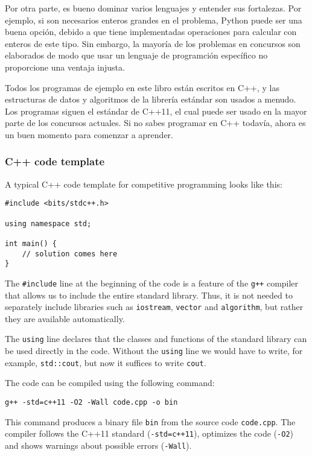 Por otra parte, es bueno dominar varios lenguajes
y entender sus fortalezas. Por ejemplo, si son
necesarios enteros grandes en el problema,
Python puede ser una buena opci\'on, debido
a que tiene implementadas operaciones para
calcular con enteros de este tipo.
Sin embargo, la mayor\'ia de los problemas
en concursos son elaborados de modo que usar
un lenguaje de programci\'on espec\'ifico
no proporcione una ventaja injusta.

Todos los programas de ejemplo en este libro est\'an
escritos en C++, y las estructuras de datos y
algoritmos de la librer\'ia est\'andar son usados
a menudo. Los programas siguen el est\'andar de C++11,
el cual puede ser usado en la mayor parte de los
concursos actuales. Si no sabes programar en
C++ todav\'ia, ahora es un buen momento
para comenzar a aprender.

\subsubsection{C++ code template}

A typical C++ code template for competitive programming
looks like this:

\begin{lstlisting}
#include <bits/stdc++.h>

using namespace std;

int main() {
    // solution comes here
}
\end{lstlisting}

The \texttt{\#include} line at the beginning
of the code is a feature of the \texttt{g++} compiler
that allows us to include the entire standard library.
Thus, it is not needed to separately include
libraries such as \texttt{iostream},
\texttt{vector} and \texttt{algorithm},
but rather they are available automatically.

The \texttt{using} line declares
that the classes and functions
of the standard library can be used directly
in the code.
Without the \texttt{using} line we would have
to write, for example, \texttt{std::cout},
but now it suffices to write \texttt{cout}.

The code can be compiled using the following command:

\begin{lstlisting}
g++ -std=c++11 -O2 -Wall code.cpp -o bin
\end{lstlisting}

This command produces a binary file \texttt{bin}
from the source code \texttt{code.cpp}.
The compiler follows the C++11 standard
(\texttt{-std=c++11}),
optimizes the code (\texttt{-O2})
and shows warnings about possible errors (\texttt{-Wall}).

